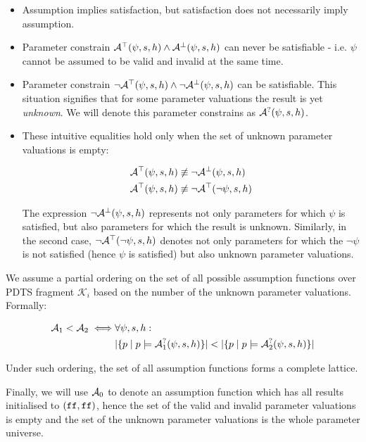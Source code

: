 \begin{itemize}
	\item Assumption implies satisfaction, but satisfaction does not necessarily imply assumption.
	\item Parameter constrain $\mathcal{A}^\top(\psi, s, h) \land \mathcal{A}^\bot(\psi, s, h)$ can never be satisfiable - i.e. $\psi$ cannot be assumed to be valid and invalid at the same time.
	\item Parameter constrain $\neg\mathcal{A}^\top(\psi, s, h) \land \neg\mathcal{A}^\bot(\psi, s, h)$ can be satisfiable. This situation signifies that for some parameter valuations the result is yet \emph{unknown}. We will denote this parameter constrains as $\mathcal{A}^?(\psi, s, h)$.
	\item These intuitive equalities hold only when the set of unknown parameter valuations is empty:
	
	\begin{align*}
		\mathcal{A}^\top(\psi, s, h) & \not\equiv \neg \mathcal{A}^\bot(\psi, s, h) \\
		\mathcal{A}^\top(\psi, s, h) & \not\equiv \neg \mathcal{A}^\top(\neg \psi, s, h)
	\end{align*}
	
	The expression $\neg \mathcal{A}^\bot(\psi, s, h)$ represents not only parameters for which $\psi$ is satisfied, but also parameters for which the result is unknown. Similarly, in the second case, $\neg \mathcal{A}^\top(\neg \psi, s, h)$ denotes not only parameters for which the $\neg \psi$ is not satisfied (hence $\psi$ is satisfied) but also unknown parameter valuations.
	
\end{itemize}

We assume a partial ordering on the set of all possible assumption functions over \ac{PDTS} fragment $\mathcal{K}_i$ based on the number of the unknown parameter valuations. Formally:

\begin{align*}
	\mathcal{A}_1 < \mathcal{A}_2 \iff & \forall \psi, s, h : \\
	 & |\{ p \mid p \models \mathcal{A}^?_1(\psi, s, h) \}| < |\{ p \mid p \models \mathcal{A}^?_2(\psi, s, h) \}|
\end{align*}

Under such ordering, the set of all assumption functions forms a complete lattice. 

Finally, we will use $\mathcal{A}_0$ to denote an assumption function which has all results initialised to $(\texttt{ff}, \texttt{ff})$, hence the set of the valid and invalid parameter valuations is empty and the set of the unknown parameter valuations is the whole parameter universe.

